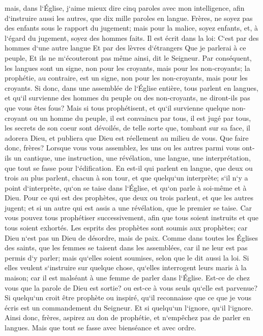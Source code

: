 \verse mais, dans l`Église, j`aime mieux dire cinq paroles avec mon intelligence, afin d`instruire aussi les autres, que dix mille paroles en langue. 
\verse Frères, ne soyez pas des enfants sous le rapport du jugement; mais pour la malice, soyez enfants, et, à l`égard du jugement, soyez des hommes faits. 
\verse Il est écrit dans la loi: C`est par des hommes d`une autre langue Et par des lèvres d`étrangers Que je parlerai à ce peuple, Et ils ne m`écouteront pas même ainsi, dit le Seigneur. 
\verse Par conséquent, les langues sont un signe, non pour les croyants, mais pour les non-croyants; la prophétie, au contraire, est un signe, non pour les non-croyants, mais pour les croyants. 
\verse Si donc, dans une assemblée de l`Église entière, tous parlent en langues, et qu`il survienne des hommes du peuple ou des non-croyants, ne diront-ils pas que vous êtes fous? 
\verse Mais si tous prophétisent, et qu`il survienne quelque non-croyant ou un homme du peuple, il est convaincu par tous, il est jugé par tous, 
\verse les secrets de son coeur sont dévoilés, de telle sorte que, tombant sur sa face, il adorera Dieu, et publiera que Dieu est réellement au milieu de vous. 
\verse Que faire donc, frères? Lorsque vous vous assemblez, les uns ou les autres parmi vous ont-ils un cantique, une instruction, une révélation, une langue, une interprétation, que tout se fasse pour l`édification. 
\verse En est-il qui parlent en langue, que deux ou trois au plus parlent, chacun à son tour, et que quelqu`un interprète; 
\verse s`il n`y a point d`interprète, qu`on se taise dans l`Église, et qu`on parle à soi-même et à Dieu. 
\verse Pour ce qui est des prophètes, que deux ou trois parlent, et que les autres jugent; 
\verse et si un autre qui est assis a une révélation, que le premier se taise. 
\verse Car vous pouvez tous prophétiser successivement, afin que tous soient instruits et que tous soient exhortés. 
\verse Les esprits des prophètes sont soumis aux prophètes; 
\verse car Dieu n`est pas un Dieu de désordre, mais de paix. Comme dans toutes les Églises des saints, 
\verse que les femmes se taisent dans les assemblées, car il ne leur est pas permis d`y parler; mais qu`elles soient soumises, selon que le dit aussi la loi. 
\verse Si elles veulent s`instruire sur quelque chose, qu`elles interrogent leurs maris à la maison; car il est malséant à une femme de parler dans l`Église. 
\verse Est-ce de chez vous que la parole de Dieu est sortie? ou est-ce à vous seuls qu`elle est parvenue? 
\verse Si quelqu`un croit être prophète ou inspiré, qu`il reconnaisse que ce que je vous écris est un commandement du Seigneur. 
\verse Et si quelqu`un l`ignore, qu`il l`ignore. 
\verse Ainsi donc, frères, aspirez au don de prophétie, et n`empêchez pas de parler en langues. 
\verse Mais que tout se fasse avec bienséance et avec ordre. 

